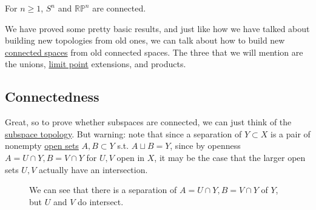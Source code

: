   \begin{example}
    \label{ex:connectedness-of-sn-and-rpn}
    For $n \geq 1$, $S^n$ and $\mathbb{RP}^n$ are connected. 
  \end{example}

  We have proved some pretty basic results, and just like how we have talked about building new topologies from old ones, we can talk about how to build new \hyperref[def:connected-space]{connected spaces} from old connected spaces. The three that we will mention are the unions, \hyperref[def:limit-point]{limit point} extensions, and products. 

\subsection{Connectedness}

  Great, so to prove whether subspaces are connected, we can just think of the \hyperref[def:subspace-topology]{subspace topology}. But warning: note that since a separation of $Y \subset X$ is a pair of nonempty \hyperref[def:open-set]{open sets} $A, B \subset Y$ s.t. $A \sqcup B = Y$, since by openness $A = U \cap Y, B = V \cap Y$ for $U, V$ open in $X$, it may be the case that the larger open sets $U, V$ actually have an intersection. 

  \begin{figure}[H]
    \centering 
    \caption{We can see that there is a separation of $A = U \cap Y, B = V \cap Y$ of $Y$, but $U$ and $V$ do intersect.} 
  \end{figure}

